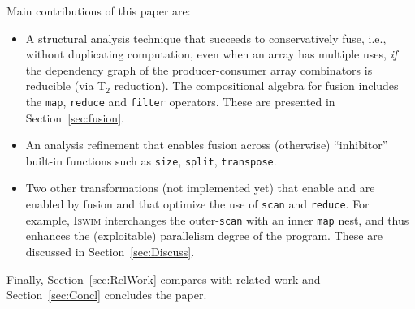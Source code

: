 \documentclass{sigplanconf}  %
\newcommand{\mymath}[1]{$ #1 $}
\begin{document}
Main contributions of this paper are:
\begin{itemize}
    \item A structural analysis technique
            that succeeds to conservatively fuse, 
            i.e., without duplicating computation, 
            even when an array has multiple uses, {\em if} 
            the dependency graph of the producer-consumer 
            array combinators is reducible 
            (via T$_2$ reduction). 
        The compositional algebra for fusion includes the {\tt map},
            {\tt reduce} and {\tt filter} operators. 
        These are presented in Section~\ref{sec:fusion}. 
    \item An analysis refinement that enables fusion across
            (otherwise) ``inhibitor'' built-in functions such
            as {\tt size}, {\tt split}, {\tt transpose}. 
    \item Two other transformations (not implemented yet) that enable 
            and are enabled by fusion and that optimize the use of 
            {\tt scan} and {\tt reduce}. For example, \textsc{Iswim}
            interchanges the outer-{\tt scan} with an inner {\tt map} 
            nest, and thus enhances the (exploitable) parallelism 
            degree of the program.
            These are discussed in Section~\ref{sec:Discuss}.
\end{itemize}
   
Finally, Section~\ref{sec:RelWork} compares with related work and
Section~\ref{sec:Concl} concludes the paper.




\end{document}
